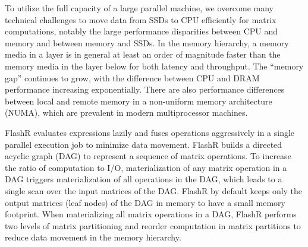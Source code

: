 

To utilize the full capacity of a large parallel machine, we overcome
many technical challenges to move data from SSDs to CPU efficiently for matrix
computations, notably the large performance disparities between CPU and memory
and between memory and SSDs. In the memory hierarchy, a memory media in a layer
is in general at least an order of magnitude faster than the memory media in
the layer below for both latency and throughput.
The ``memory gap'' \cite{Wilkes01} continues to grow, with 
the difference between CPU and DRAM performance increasing exponentially. 
There are also performance differences between
local and remote memory in a non-uniform memory architecture (NUMA), which are prevalent
in modern multiprocessor machines. 

FlashR evaluates expressions lazily and fuses operations aggressively
in a single parallel execution job to minimize data movement. FlashR
builds a directed acyclic graph (DAG) to represent a sequence of matrix
operations. To increase the ratio of computation to I/O, materialization
of any matrix operation in a DAG triggers materialization of all operations
in the DAG, which leads to a single scan over the input matrices of the DAG.
FlashR by default keeps only the output matrices (leaf nodes) of the DAG
in memory to have a small memory footprint. When materializing all matrix
operations in a DAG,
FlashR performs two levels of matrix partitioning and reorder computation
in matrix partitions to reduce data movement in the memory hierarchy.

